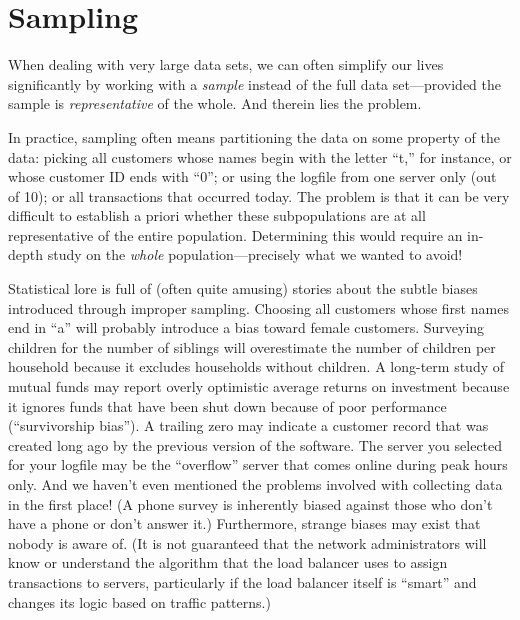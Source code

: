 \begin{unnumlist}
\end{unnumlist}

\section{Sampling}

 
When dealing with very large data sets, we can often simplify our
lives significantly by working with a \emph{sample} instead of the
full data set---provided the sample is \emph{representative} of the
whole.  And therein lies the problem.

In practice, sampling often means partitioning the data on some
property of the data: picking all customers whose names begin with the
letter ``t,'' for instance, or whose customer ID ends with ``0''; or
using the logfile from one server only (out of 10); or all
transactions that occurred today. The problem is that it can be very
difficult to establish a priori whether these subpopulations are at
all representative of the entire population. Determining this would
require an in-depth study on the \emph{whole} population---precisely
what we wanted to avoid!

Statistical lore is full of (often quite amusing) stories about the
subtle biases introduced through improper sampling. Choosing all
customers whose first names end in ``a'' will probably introduce a
bias toward female customers. Surveying children for the number of
siblings will overestimate the number of children per household
because it excludes households without children. A long-term study of
mutual funds may report overly optimistic average returns on
investment\vadjust{\pagebreak} because it ignores funds that have been shut down because of
poor performance (``survivorship bias'').  A trailing zero may
indicate a customer record that was created long ago by the previous
version of the software. The server you selected for your logfile may
be the ``overflow'' server that comes online during peak hours only.
And we haven't even mentioned the problems involved with collecting
data in the first place! (A phone survey is inherently biased against
those who don't have a phone or don't answer it.)  Furthermore,
strange biases may exist that nobody is aware of.  (It is not
guaranteed that the network administrators will know or understand the
algorithm that the load balancer uses to assign transactions to
servers,  particularly if the load balancer itself is ``smart'' and
changes its logic based on traffic patterns.)


